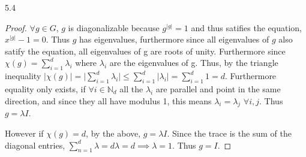 \documentclass{article}
\newcommand{\N}{\mathbb{N}}
\newcommand{\abs}[1]{\lvert #1\rvert}
\begin{document}
\bigskip

\begin{PROB}{5.4}\label{Problem 5.4.}
\end{PROB}
\begin{proof}
    $\forall g \in G$, $g$ is diagonalizable because $g^{|g|} = 1$ and thus satifies the equation, $x^{|g|} - 1 = 0$. Thus $g$ has eigenvalues, furthermore since all eigenvalues of $g$ also satify the equation, all eigenvalues of g are roots of unity. Furthermore since $\chi(g) = \sum_{i = 1}^{d} \lambda_i$ where $\lambda_i$ are the eigenvalues of g. Thus, by the triangle inequality $\abs{\chi(g)} = \abs{\sum_{i = 1}^{d} \lambda_i} \leq \sum_{i = 1}^{d} \abs{\lambda_i} = \sum_{i = 1}^{d}1 = d$. Furthermore equality only exists, if $\forall i \in \N_d$ all the $\lambda_i$ are parallel and point in the same direction, and since they all have modulus 1, this means $\lambda_i = \lambda_j$ $\forall i, j$. Thus $g = \lambda I$.
    
    
    However if $\chi(g) = d$, by the above, $g = \lambda I$. Since the trace is the sum of the diagonal entries, $\sum_{n = 1}^{d} \lambda = d \lambda = d \implies \lambda = 1$. Thus $g = I$.    
\end{proof}

\bigskip
\end{document}
